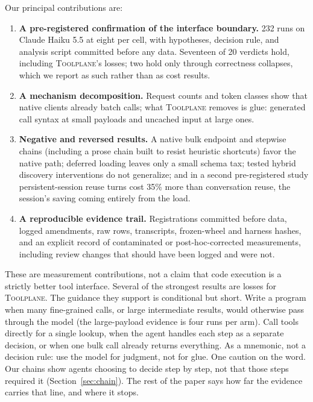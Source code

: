 \documentclass[10pt,twocolumn]{article}
\newcommand{\toolplane}{\textsc{Toolplane}\xspace}
\begin{document}
Our principal contributions are:

\begin{enumerate}
  \item \textbf{A pre-registered confirmation of the interface boundary.}
  232 runs on Claude Haiku 5.5 at eight per cell, with hypotheses, decision
  rule, and analysis script committed before any data.  Seventeen of 20
  verdicts hold, including \toolplane's losses; two hold only through
  correctness collapses, which we report as such rather than as cost
  results.
  \item \textbf{A mechanism decomposition.}  Request counts and token classes
  show that native clients already batch calls; what \toolplane removes is
  glue: generated call syntax at small payloads and uncached input at large
  ones.
  \item \textbf{Negative and reversed results.}  A native bulk endpoint and
  stepwise chains (including a prose chain built to resist heuristic
  shortcuts) favor the native path; deferred loading leaves only a small
  schema tax; tested hybrid discovery interventions do not generalize; and in
  a second pre-registered study persistent-session reuse turns cost 35\%
  more than conversation reuse, the session's saving coming entirely from the
  load.
  \item \textbf{A reproducible evidence trail.}  Registrations committed
  before data, logged amendments, raw rows, transcripts, frozen-wheel and
  harness hashes, and an explicit record of contaminated or post-hoc-corrected
  measurements, including review changes that should have been logged and
  were not.
\end{enumerate}

These are measurement contributions, not a claim that code execution is a
strictly better tool interface.  Several of the strongest results are losses
for \toolplane.  The guidance they support is conditional but short.  Write a
program when many fine-grained calls, or large intermediate results, would
otherwise pass through the model (the large-payload evidence is four runs
per arm).  Call tools directly for a single lookup, when the agent handles
each step as a separate decision, or when one bulk call already returns
everything.  As a mnemonic, not a decision rule: use the model for judgment,
not for glue.  One caution on the word.  Our chains show agents choosing to
decide step by step, not that those steps required it
(Section~\ref{sec:chain}).  The rest of the paper says how far the evidence
carries that line, and where it stops.
\end{document}
